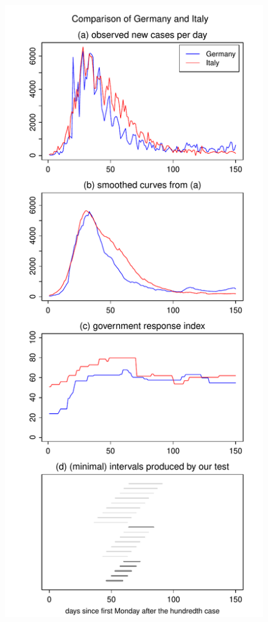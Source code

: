 \documentclass[a4paper,12pt]{article}
\numberwithin{equation}{section}
\begin{document}
{\begin{figure}[h!]
\begin{minipage}[t]{0.49\textwidth}
\includegraphics[width=\textwidth]{plots/DEU_vs_ITA_wa}

\end{minipage}
\end{figure}}
\end{document}
